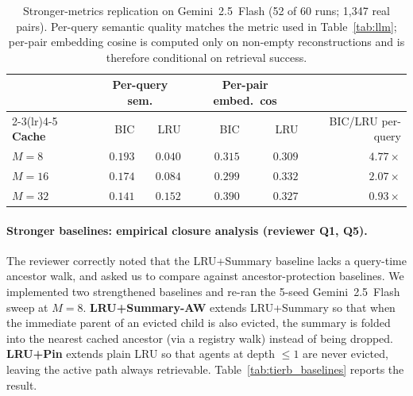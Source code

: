 \documentclass[fleqn,10pt]{article}
\theoremstyle{definition}
\newcommand{\slots}{M}
\begin{document}
\begin{table}[t]
\centering
\caption{Stronger-metrics replication on Gemini~2.5~Flash (52 of 60 runs; 1{,}347 real pairs). Per-query semantic quality matches the metric used in Table~\ref{tab:llm}; per-pair embedding cosine is computed only on non-empty reconstructions and is therefore conditional on retrieval success.}
\label{tab:stronger-metrics}
\small
\setlength{\tabcolsep}{4pt}
\begin{tabular}{lrrrrr}
\toprule
 & \multicolumn{2}{c}{\textbf{Per-query sem.}} & \multicolumn{2}{c}{\textbf{Per-pair embed.\ cos}} & \\
\cmidrule(lr){2-3}\cmidrule(lr){4-5}
\textbf{Cache} & BIC & LRU & BIC & LRU & BIC/LRU per-query \\
\midrule
$\slots{=}8$  & $0.193$ & $0.040$ & $0.315$ & $0.309$ & $4.77\times$ \\
$\slots{=}16$ & $0.174$ & $0.084$ & $0.299$ & $0.332$ & $2.07\times$ \\
$\slots{=}32$ & $0.141$ & $0.152$ & $0.390$ & $0.327$ & $0.93\times$ \\
\bottomrule
\end{tabular}
\end{table}

\paragraph{Stronger baselines: empirical closure analysis (reviewer Q1, Q5).}
The reviewer correctly noted that the LRU+Summary baseline lacks a
query-time ancestor walk, and asked us to compare against
ancestor-protection baselines. We implemented two strengthened
baselines and re-ran the 5-seed Gemini~2.5~Flash sweep at
$\slots = 8$. \textbf{LRU+Summary-AW} extends LRU+Summary so that
when the immediate parent of an evicted child is also evicted, the
summary is folded into the nearest cached ancestor (via a registry
walk) instead of being dropped. \textbf{LRU+Pin} extends plain LRU
so that agents at depth $\leq 1$ are never evicted, leaving the
active path always retrievable. Table~\ref{tab:tierb_baselines}
reports the result.
\end{document}
